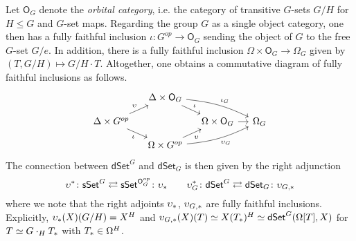 \documentclass[a4paper,10pt
,draft
]{article}%
\numberwithin{equation}{section}
\numberwithin{figure}{section}
\theoremstyle{definition} %
\newcommand{\dSet}{\mathsf{dSet}}
\newcommand{\1}{\ensuremath{\mathbbm 1}}%
\begin{document}
Let $\mathsf{O}_G$
denote the \emph{orbital category},
i.e. the category of transitive $G$-sets $G/H$ for $H\leq G$ and $G$-set maps.
Regarding the group $G$ as a single object category,
one then has a fully faithful inclusion
$\iota \colon G^{op} \to \mathsf{O}_G$
sending the object of $G$ to the free $G$-set $G/e$. 
In addition, there is a fully faithful inclusion
$\Omega \times \mathsf{O}_G \to \Omega_G$
given by
$(T,G/H) \mapsto G/H \cdot T$.
Altogether, one obtains a commutative diagram of fully faithful inclusions as follows.
\begin{equation}
\begin{tikzcd}[row sep=9,column sep=11]
	&
	\Delta \times \mathsf{O}_G 
	\ar{rd}{\iota}
	\ar[bend left=10]{rrd}{\iota_G}
	&
\\
	\Delta \times G^{op} 
	\ar{ru}{\upsilon}
	\ar{rd}[swap]{\iota}
	&&
	\Omega \times \mathsf{O}_G
	\ar{r}
	&
	\Omega_G
\\
	&
	\Omega \times G^{op}
	\ar{ru}[swap]{\upsilon}
	\ar[bend right=10]{rru}[swap]{\upsilon_G}
	&
\end{tikzcd}
\end{equation}
The connection between 
$\mathsf{dSet}^G$ and $\mathsf{dSet}_G$
is then given by the right adjunction
\begin{equation}\label{UPSILONADJ EQ}
	\upsilon^{\**} \colon 
	\mathsf{sSet}^G
	\rightleftarrows
	\mathsf{sSet}^{\mathsf{O}_G^{op}}
	\colon
	\upsilon_{\**}
\qquad
	\upsilon_G^{\**} \colon 
	\mathsf{dSet}^G
	\rightleftarrows
	\mathsf{dSet}_G
	\colon
	\upsilon_{G,\**}
\end{equation}
where we note that the right adjoints 
$\upsilon_{\**}$, $\upsilon_{G,\**}$
are fully faithful inclusions.
Explicitly, 
$\upsilon_{\**}(X)(G/H) = X^H$ and
$\upsilon_{G,\**}(X)(T) \simeq X(T_{\**})^H \simeq \dSet^G(\Omega[T], X)$
for $T \simeq G \cdot_H T_{\**}$ with $T_{\**} \in \Omega^H$.
\end{document}
